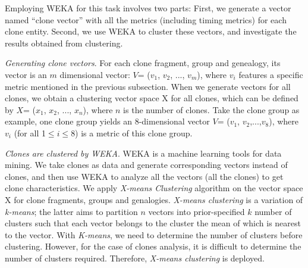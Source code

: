 Employing WEKA for this task involves two parts: First, we generate a vector named ``clone vector'' with all the metrics (including timing metrics) for each clone entity. Second, we use WEKA to cluster these vectors, and investigate the results obtained from clustering. %

 {\em Generating clone vectors}. For each clone fragment, group and genealogy, its vector is an $m$ dimensional vector: {$V$= {($v_1$, $v_2$, $...$, $v_m$)}}, where $v_i$ features a specific metric mentioned in the previous subsection. When we generate vectors for all clones, we obtain a clustering vector space X for all clones, which can be defined by {$X$= {($x_1$, $ x_2$, $...$, $ x_n$)}}, where $n$ is the number of clones. %
 Take the clone group as example, one clone group yields an 8-dimensional vector {$V$= ($v_1$, $v_2$,$...$,$ v_8$)}, where $v_i$ (for all 1$\le$$i$$\leq$8) is a metric of this clone group.
  
 {\em Clones are clustered by WEKA}. WEKA is a machine learning tools for data mining.
 We take clones as data and generate corresponding vectors instead of clones, and then use WEKA to analyze all the vectors (all the clones) to get clone characteristics. %
We apply {\em X-means Clustering} algorithm on the vector space X for clone fragments, groups and genalogies. {\em X-means clustering} is a variation of {\em k-means}; the latter aims to partition $n$ vectors into prior-specified $k$ number of clusters such that each vector belongs to the cluster the mean of which is nearest to the vector. With {\em K-means}, we need to determine the number of clusters before clustering. However, for the case of clones analysis, it is difficult to determine the number of clusters required. Therefore, {\em X-means clustering} is deployed. 

